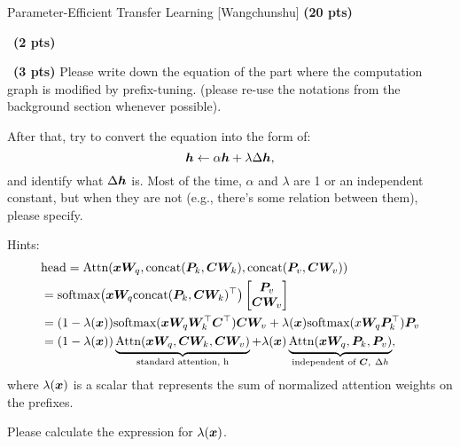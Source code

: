 \begin{question}{
Parameter-Efficient Transfer Learning [Wangchunshu] \textbf{(20 pts)}}
\begin{subquestion}{~\small \textbf{(2 pts)}}
\end{subquestion}

\begin{subquestion}{~\small \textbf{(3 pts)}}
Please write down the equation of the part where the computation graph is modified by prefix-tuning. (please re-use the notations from the background section whenever possible).

After that, try to convert the equation into the form of:
\begin{equation}
\label{eq:prefix}
    {\bm{h}} \leftarrow \alpha {\bm{h}} + \lambda \Delta{\bm{h}},
\end{equation}
and identify what $\Delta{\bm{h}}$ is. Most of the time, $\alpha$ and $\lambda$ are 1 or an independent constant, but when they are not (e.g., there's some relation between them), please specify.

Hints:
\begin{equation}
\label{eq:prefix-adapter}
\begin{split}
& \text{head} = \text{Attn}({\bm{x}}{\bm{W}}_q, \text{concat}({\bm{P}}_k, {\bm{C}}{\bm{W}}_k), \text{concat}({\bm{P}}_v, {\bm{C}}{\bm{W}}_v)) \\
& = \text{softmax}\big({\bm{x}}{\bm{W}}_q\text{concat}({\bm{P}}_k, {\bm{C}}{\bm{W}}_k)^\top\big) \begin{bmatrix} {\bm{P}}_v \\ {\bm{C}}{\bm{W}}_v \end{bmatrix} \\
& = (1 - \lambda({\bm{x}})) \text{softmax}({\bm{x}}{\bm{W}}_q{\bm{W}}_k^\top{\bm{C}}^\top){\bm{C}}{\bm{W}}_v + \lambda({\bm{x}})\text{softmax}(x{\bm{W}}_q{\bm{P}}_k^\top){\bm{P}}_v \\
& = (1 - \lambda({\bm{x}})) \underbrace{ \text{Attn}({\bm{x}}{\bm{W}}_q, {\bm{C}}{\bm{W}}_k, {\bm{C}}{\bm{W}}_v) }_{\text{standard attention, h}} + \lambda({\bm{x}}) \underbrace{ \text{Attn}({\bm{x}}{\bm{W}}_q, {\bm{P}}_k, {\bm{P}}_v) }_{\text{independent of }{\bm{C}},\  \Delta h},
\end{split}
\end{equation}
where $\lambda({\bm{x}})$ is a scalar that represents the sum of normalized attention weights on the prefixes.

Please calculate the expression for $\lambda({\bm{x}})$.

\end{subquestion}
\end{question}
